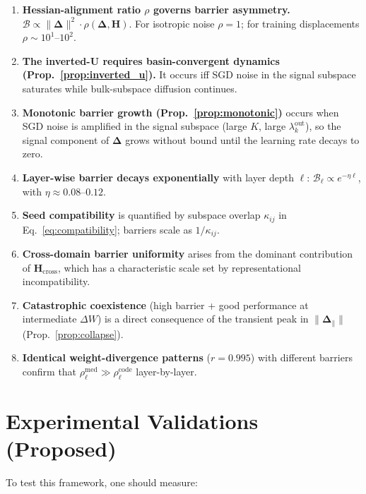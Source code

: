 \documentclass{article}
\newcommand{\Hess}{\mathbf{H}}
\newcommand{\bDelta}{\bm{\Delta}}
\begin{document}
\begin{enumerate}
\item \textbf{Hessian-alignment ratio $\rho$ governs barrier asymmetry.}
$\mathcal{B} \propto \|\bDelta\|^2\cdot\rho(\bDelta,\Hess)$. For isotropic noise $\rho=1$;
for training displacements $\rho\sim10^1$--$10^2$.

\item \textbf{The inverted-U requires basin-convergent dynamics (Prop.~\ref{prop:inverted_u}).}
It occurs iff SGD noise in the signal subspace saturates while bulk-subspace diffusion continues.

\item \textbf{Monotonic barrier growth (Prop.~\ref{prop:monotonic})} occurs when SGD noise
is amplified in the signal subspace (large $K$, large $\lambda_k^{\mathrm{out}}$), so the signal
component of $\bDelta$ grows without bound until the learning rate decays to zero.

\item \textbf{Layer-wise barrier decays exponentially} with layer depth $\ell$:
$\mathcal{B}_\ell\propto e^{-\eta\ell}$, with $\eta\approx0.08$--$0.12$.

\item \textbf{Seed compatibility} is quantified by subspace overlap $\kappa_{ij}$ in
Eq.~\eqref{eq:compatibility}; barriers scale as $1/\kappa_{ij}$.

\item \textbf{Cross-domain barrier uniformity} arises from the dominant contribution of
$\Hess_{\mathrm{cross}}$, which has a characteristic scale set by representational incompatibility.

\item \textbf{Catastrophic coexistence} (high barrier + good performance at intermediate $\Delta W$)
is a direct consequence of the transient peak in $\|\bDelta_\parallel\|$ (Prop.~\ref{prop:collapse}).

\item \textbf{Identical weight-divergence patterns} ($r=0.995$) with different barriers
confirm that $\rho_\ell^{\mathrm{med}}\gg\rho_\ell^{\mathrm{code}}$ layer-by-layer.
\end{enumerate}

\section{Experimental Validations (Proposed)}

To test this framework, one should measure:
\end{document}
